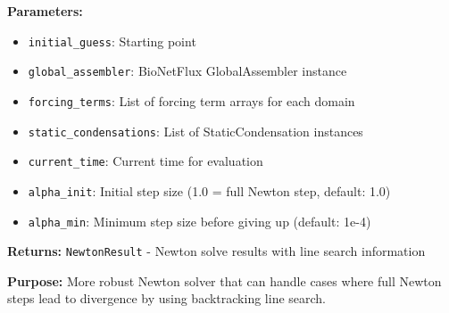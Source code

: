 \textbf{Parameters:}
\begin{itemize}
    \item \texttt{initial\_guess}: Starting point
    \item \texttt{global\_assembler}: BioNetFlux GlobalAssembler instance
    \item \texttt{forcing\_terms}: List of forcing term arrays for each domain
    \item \texttt{static\_condensations}: List of StaticCondensation instances
    \item \texttt{current\_time}: Current time for evaluation
    \item \texttt{alpha\_init}: Initial step size (1.0 = full Newton step, default: 1.0)
    \item \texttt{alpha\_min}: Minimum step size before giving up (default: 1e-4)
\end{itemize}

\textbf{Returns:} \texttt{NewtonResult} - Newton solve results with line search information

\textbf{Purpose:} More robust Newton solver that can handle cases where full Newton steps lead to divergence by using backtracking line search.

